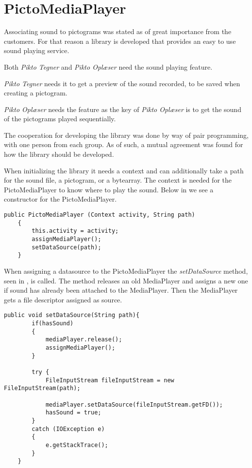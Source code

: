 \section{PictoMediaPlayer}
Associating sound to pictograms was stated as of great importance from the customers.
For that reason a library is developed that provides an easy to use sound playing service.

Both \textit{Pikto Tegner} and \textit{Pikto Oplæser} need the sound playing feature. 

\textit{Pikto Tegner} needs it to get a preview of the sound recorded, to be saved when creating a pictogram.

\textit{Pikto Oplæser} needs the feature as the key of \textit{Pikto Oplæser} is to get the sound of the pictograms played sequentially. 

The cooperation for developing the library was done by way of pair programming, with one person from each group.
As of such, a mutual agreement was found for how the library should be developed.

When initializing the library it needs a context and can additionally take a path for the sound file, a pictogram, or a bytearray. The context is needed for the PictoMediaPlayer to know where to play the sound. Below in  we see a constructor for the PictoMediaPlayer.

\begin{lstlisting}[label=lst:constructor, caption = {Constructor for PictoMediaPlayer}]
    public PictoMediaPlayer (Context activity, String path)
    {
        this.activity = activity;
        assignMediaPlayer();
        setDataSource(path);
    }
\end{lstlisting}

When assigning a datasource to the PictoMediaPlayer the \textit{setDataSource} method, seen in , is called. The method releases an old MediaPlayer and assigns a new one if sound has already been attached to the MediaPlayer.
Then the MediaPlayer gets a file descriptor assigned as source.

\begin{lstlisting}[label=lst:setdatasource, caption={SetDataSource method of PictoMediaPlayer}]
public void setDataSource(String path){
        if(hasSound)
        {
            mediaPlayer.release();
            assignMediaPlayer();
        }

        try {
            FileInputStream fileInputStream = new FileInputStream(path);

            mediaPlayer.setDataSource(fileInputStream.getFD());
            hasSound = true;
        }
        catch (IOException e)
        {
            e.getStackTrace();
        }
    }
\end{lstlisting}

